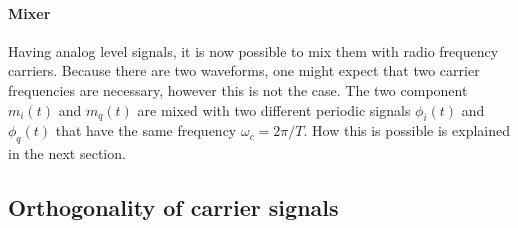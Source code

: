\paragraph{Mixer}

Having analog level signals, it is now possible to mix them with radio frequency carriers. Because there are two waveforms, one might expect that two carrier frequencies are necessary, however this is not the case. The two component \(m_i(t)\) and \(m_q(t)\) are mixed with two different periodic signals \(\phi_i(t)\) and \(\phi_q(t)\) that have the same frequency \(\omega_c = 2\pi / T\). How this is possible is explained in the next section.


\subsection{Orthogonality of carrier signals}

